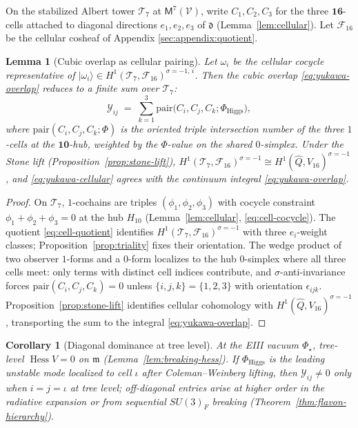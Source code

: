 \documentclass[11pt]{article}
\theoremstyle{plain}
\newtheorem{lemma}[theorem]{Lemma}
\newtheorem{corollary}[theorem]{Corollary}
\theoremstyle{definition}
\theoremstyle{remark}
\numberwithin{equation}{section}
\newcommand{\Void}{\mathcal{V}}
\newcommand{\Mirror}{\mathsf{M}}
\newcommand{\orderparam}{\Phi}
\newcommand{\Hess}{\operatorname{Hess}}
\begin{document}
On the stabilized Albert tower $\mathcal{T}_7$ at $\Mirror^7(\Void)$, write
$C_1,C_2,C_3$ for the three $\mathbf{16}$-cells attached to diagonal
directions $e_1,e_2,e_3$ of $\mathfrak{d}$ (Lemma~\ref{lem:cellular}).
Let $\mathcal{F}_{16}$ be the cellular cosheaf of Appendix
\ref{sec:appendix:quotient}.

\begin{lemma}[Cubic overlap as cellular pairing]\label{lem:yukawa-cellular}
Let $\omega_i$ be the cellular cocycle representative of
$|\omega_i\rangle\in H^1(\mathcal{T}_7,\mathcal{F}_{16})^{\sigma=-1,\,i}$.
Then the cubic overlap \eqref{eq:yukawa-overlap} reduces to a finite sum
over $\mathcal{T}_7$:
\begin{equation}\label{eq:yukawa-cellular}
  \mathcal{Y}_{ij}
  \;=\;
  \sum_{k=1}^3
  \mathrm{pair}\!\bigl(C_i,C_j,C_k;\Phi_{\mathrm{Higgs}}\bigr),
\end{equation}
where $\mathrm{pair}(C_i,C_j,C_k;\Phi)$ is the oriented triple intersection
number of the three $1$-cells at the $\mathbf{10}$-hub, weighted by the
$\Phi$-value on the shared $0$-simplex. Under the Stone lift
(Proposition~\ref{prop:stone-lift}),
$H^1(\mathcal{T}_7,\mathcal{F}_{16})^{\sigma=-1}\cong
H^1(\hat Q,V_{16})^{\sigma=-1}$, and \eqref{eq:yukawa-cellular} agrees with
the continuum integral \eqref{eq:yukawa-overlap}.
\end{lemma}

\begin{proof}
On $\mathcal{T}_7$, $1$-cochains are triples $(\phi_1,\phi_2,\phi_3)$ with
cocycle constraint $\phi_1+\phi_2+\phi_3=0$ at the hub $H_{10}$
(Lemma~\ref{lem:cellular}, \eqref{eq:cell-cocycle}). The quotient
\eqref{eq:cell-quotient} identifies
$H^1(\mathcal{T}_7,\mathcal{F}_{16})^{\sigma=-1}$ with three
$e_i$-weight classes; Proposition~\ref{prop:triality} fixes their orientation.
The wedge product of two observer $1$-forms and a $0$-form localizes to the hub
$0$-simplex where all three cells meet: only terms with distinct cell indices
contribute, and $\sigma$-anti-invariance forces
$\mathrm{pair}(C_i,C_j,C_k)=0$ unless $\{i,j,k\}=\{1,2,3\}$ with orientation
$\epsilon_{ijk}$. Proposition~\ref{prop:stone-lift} identifies cellular
cohomology with $H^1(\hat Q,V_{16})^{\sigma=-1}$, transporting the sum to the
integral \eqref{eq:yukawa-overlap}.
\end{proof}

\begin{corollary}[Diagonal dominance at tree level]\label{cor:yukawa-diagonal}
At the EIII vacuum $\orderparam_\star$, tree-level $\Hess V=0$ on
$\mathfrak{m}$ (Lemma~\ref{lem:breaking-hess}). If
$\Phi_{\mathrm{Higgs}}$ is the leading unstable mode localized to cell
$\iota$ after Coleman--Weinberg lifting, then
$\mathcal{Y}_{ij}\neq0$ only when $i=j=\iota$ at tree level; off-diagonal
entries arise at higher order in the radiative expansion or from sequential
$SU(3)_F$ breaking (Theorem~\ref{thm:flavon-hierarchy}).
\end{corollary}
\end{document}
